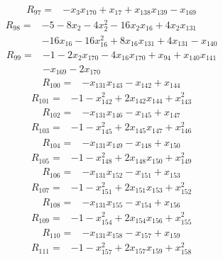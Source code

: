 \begin{align*} R_{97}={}&-x_{3}x_{170} +x_{17} +x_{138}x_{139} -x_{169}
\end{align*}
\begin{align*} R_{98}={}&-5 -8 x_{2} -4 x_{2}^{2} -16 x_{2}x_{16} +4 x_{2}x_{131}
\\ &-16 x_{16} -16 x_{16}^{2} +8 x_{16}x_{131} +4 x_{131} -x_{140}
\end{align*}
\begin{align*} R_{99}={}&-1 -2 x_{2}x_{170} -4 x_{16}x_{170} +x_{94} +x_{140}x_{141}
\\ &-x_{169} -2 x_{170}
\end{align*}
\begin{align*} R_{100}={}&-x_{131}x_{143} -x_{142} +x_{144}
\end{align*}
\begin{align*} R_{101}={}&-1 -x_{142}^{2} +2 x_{142}x_{144} +x_{143}^{2}
\end{align*}
\begin{align*} R_{102}={}&-x_{131}x_{146} -x_{145} +x_{147}
\end{align*}
\begin{align*} R_{103}={}&-1 -x_{145}^{2} +2 x_{145}x_{147} +x_{146}^{2}
\end{align*}
\begin{align*} R_{104}={}&-x_{131}x_{149} -x_{148} +x_{150}
\end{align*}
\begin{align*} R_{105}={}&-1 -x_{148}^{2} +2 x_{148}x_{150} +x_{149}^{2}
\end{align*}
\begin{align*} R_{106}={}&-x_{131}x_{152} -x_{151} +x_{153}
\end{align*}
\begin{align*} R_{107}={}&-1 -x_{151}^{2} +2 x_{151}x_{153} +x_{152}^{2}
\end{align*}
\begin{align*} R_{108}={}&-x_{131}x_{155} -x_{154} +x_{156}
\end{align*}
\begin{align*} R_{109}={}&-1 -x_{154}^{2} +2 x_{154}x_{156} +x_{155}^{2}
\end{align*}
\begin{align*} R_{110}={}&-x_{131}x_{158} -x_{157} +x_{159}
\end{align*}
\begin{align*} R_{111}={}&-1 -x_{157}^{2} +2 x_{157}x_{159} +x_{158}^{2}
\end{align*}
